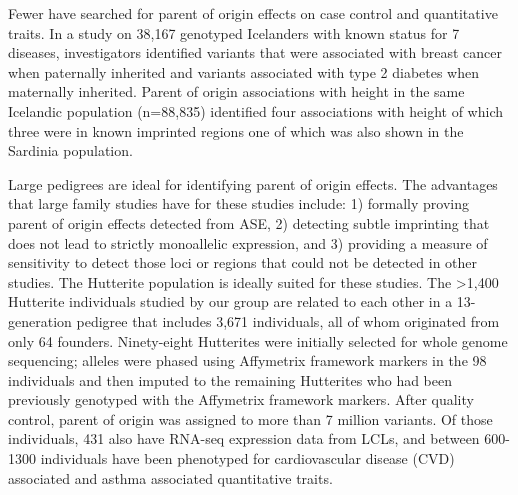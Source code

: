 Fewer have searched for parent of origin effects on case control and quantitative traits. In a study on 38,167 genotyped Icelanders with known status for 7 diseases, investigators identified variants that were associated with breast cancer when paternally inherited and variants associated with type 2 diabetes when maternally inherited\cite{Kong:2009kk}. Parent of origin associations with height in the same Icelandic population (n=88,835) identified four associations with height of which three were in known imprinted regions one of which was also shown in the Sardinia population\cite{Zoledziewska:2015do}.

Large pedigrees are ideal for identifying parent of origin effects\cite{Baran:2015cx}. The advantages that large family studies have for these studies include: 1) formally proving parent of origin effects detected from ASE, 2) detecting subtle imprinting that does not lead to strictly monoallelic expression, and 3) providing a measure of sensitivity to detect those loci or regions that could not be detected in other studies.\cite{Baran:2015cx} The Hutterite population is ideally suited for these studies. The \textgreater 1,400 Hutterite individuals studied by our group are related to each other in a 13-generation pedigree that includes 3,671 individuals, all of whom originated from only 64 founders. Ninety-eight Hutterites were initially selected for whole genome sequencing; alleles were phased using Affymetrix framework markers in the 98 individuals and then imputed to the remaining Hutterites who had been previously genotyped with the Affymetrix framework markers\cite{Livne2015}. After quality control, parent of origin was assigned to more than 7 million variants. Of those individuals, 431 also have RNA-seq expression data from LCLs, and between 600-1300 individuals have been phenotyped for cardiovascular disease (CVD) associated  and asthma associated quantitative traits.


